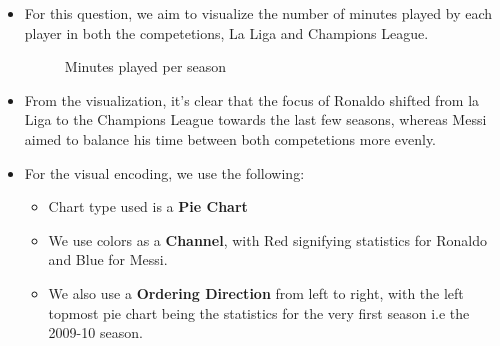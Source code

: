 \documentclass[a4paper]{article}
\begin{document}
\begin{itemize}
    \item For this question, we aim to visualize the number of minutes played by each player in both the competetions, La Liga and Champions League.
    \begin{figure}[H]
        \centering
        \qquad
        \caption{Minutes played per season}
        \label{fig:minutes}
    \end{figure}
    \item From the visualization, it's clear that the focus of Ronaldo shifted from la Liga to the Champions League towards the last few seasons, whereas Messi aimed to balance his time between both competetions more evenly.
    \item For the visual encoding, we use the following:
    \begin{itemize}
        \item Chart type used is a \textbf{Pie Chart}  
        \item We use colors as a \textbf{Channel}, with Red signifying statistics for Ronaldo and Blue for Messi.  
        \item We also use a \textbf{Ordering Direction} from left to right, with the left topmost pie chart being the statistics for the very first season i.e the 2009-10 season.  
    \end{itemize}
\end{itemize}
\end{document}
